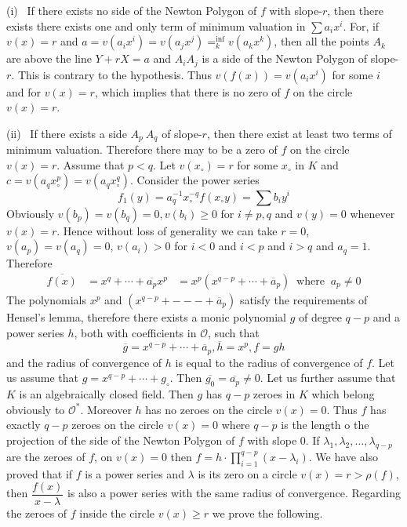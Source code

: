 (i)~ If there exists no side of the Newton Polygon of $f$ with
  slope-$r$, then there exists there exists one and only term of
  minimum valuation in $\sum a_{i}x^{i}$. For, if $v(x)=r$ and
  $a= v(a_{i}x^{i})= v(a_{j}x^{j})=^{\inf}_{k}v(a_{k}x^{k})$, then all the points
  $A_{k}$ are above the line $Y+rX=a$ and ${A_i A_j}$ is a side of the
  Newton Polygon of slope-$r$. This is contrary to the hypothesis. Thus
  $v(f(x)) =v(a_{i}x^{i})$ for some $i$ and for $v(x)=r$, which
  implies that there is no zero of $f$ on the circle $v(x)=r$. 

(ii)~ If there exists a side $A_p~ A_q$ of slope-$r$, then there exist
  at least two terms of minimum valuation. Therefore
  there may to be a zero of $f$ on the circle $v(x)=r$. Assume that
  $p<q$. Let $v(x_{\circ})=r$ for some $x_{\circ}$ in $K$ and
  $c=v(a_{q} x^{p}_{\circ})=v(a_{q} x^{q}_{\circ})$. Consider the
  power series  
  $$
  f_1(y)=a^{-1}_{q}x^{-q}_{\circ}f(x_{\circ}y)=\sum b_{i}y^{i}
  $$
  Obviously $v(b_{p})=v(b_{q})=0, v(b_{i})\geq 0$  for   $i\neq p,q$
  and $v(y)=0$  whenever $v(x)=r$. Hence without loss of generality we
  can take $r=0$, $v(a_{p})=v(a_{q})=0$, $v(a_{i})>0$ for $i<0$ and $i<p$ and
  $i>q$ and $a_{q}=1$. Therefore  
  \begin{align*}
    \overline{f(x)} &= x^{q}+\cdots+\overline{a_{p}} x^{p}
    &=x^{p}(x^{q-p}+\cdots+\overline{a}_{p})~\text{ where }~a_{p}\neq 0
  \end{align*}
  The polynomials $x^p$ and $(x^{q-p}+---+\overline{a}_{p})$ satisfy
  the requirements of Hensel's lemma, therefore there exists a monic
  polynomial $g$ of degree $q-p$ and a power series $h$, both with
  coefficients in $\mathscr{O}$, such that  
  $$
  \overline{g}=x^{q-p}+\cdots+\overline{a}_{p}, \overline{h}=x^{p}, f=gh
  $$\pageoriginale 
  and the radius of convergence of $h$ is equal to the radius of
  convergence of $f$. Let us assume that
  $g=x^{q-p}+\cdots+g_{\circ}$. Then
  $\overline{g_{0}}=\overline{a_{p}}\neq 0$. Let us further assume
  that $K$ is an algebraically closed field. Then $g$ has $q-p$ zeroes
  in $K$ which belong obviously to $\mathscr{O}^*$. Moreover $h$ has
  no zeroes on the circle $v(x)=0$. Thus $f$ has exactly $q-p$ zeroes
  on the circle $v(x)=0$ where $q-p$ is the length o the projection
  of the side of the Newton Polygon of $f$ with slope 0. If
  $\lambda_1, \lambda_2,\ldots,\lambda_{q-p}$
  are the zeroes of $f$, on $v(x)=0$ then $f=h\cdot
  \prod\limits^{q-p}_{i=1} 
 (x-\lambda_{i})$. We have also proved that if $f$ is a power
  series and $\lambda$ is its zero on a circle $v(x)=r>\rho(f)$, then
  $\dfrac{f(x)}{x-\lambda}$ is also a power series with the same
  radius of convergence. Regarding the zeroes of $f$ inside the circle
  $v(x)\geq r$ we prove the following. 

